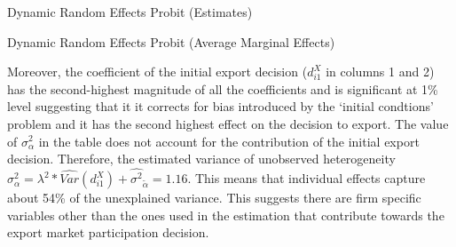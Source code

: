\documentclass[12pt]{article}
\begin{document}
\begin{center}
\begin{table}[H]
\caption{Dynamic Random Effects Probit (Estimates)}
\label{tab:dynprobit}

\end{table}
\end{center}
\restoregeometry
\begin{center}
\begin{table}[H]
\caption{Dynamic Random Effects Probit (Average Marginal Effects)}
\label{tab:dynprobitme}

\end{table}
\end{center}

Moreover, the coefficient
 of the initial export decision ($d_{i1}^{X}$ in columns 1 and 2) has the second-highest
     magnitude  of all the coefficients and  is significant at 1\% level
suggesting that it it corrects for bias introduced by the `initial
condtions' problem and it has the second highest effect on the
decision to export.
 The value of
  $\sigma^2_{\alpha}$ in the table does not account for the
  contribution of the initial export decision. Therefore, the estimated
  variance of 
  unobserved heterogeneity $\sigma^2_{\alpha}= \lambda^2 *
  \hat{Var}(d_{i1}^{X})+\hat{\sigma^2}_{\tilde{\alpha}}= 1.16$. This means that individual effects capture about 54\% of the unexplained
  variance. This suggests there are firm specific variables other than the ones used
  in the estimation that contribute towards the export market
  participation decision. 

 
\end{document}
